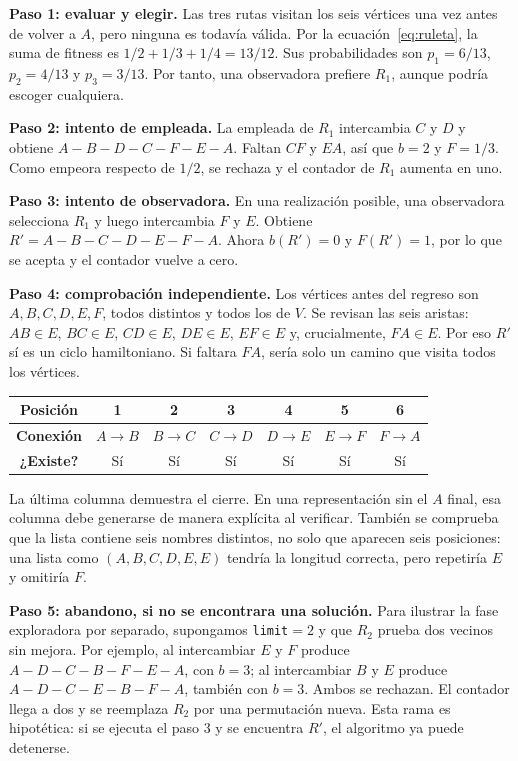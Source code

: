 \documentclass[11pt,letterpaper]{article}
\begin{document}
\noindent\textbf{Paso 1: evaluar y elegir.} Las tres rutas visitan los seis vértices una vez antes de volver a $A$, pero ninguna es todavía válida. Por la ecuación~\eqref{eq:ruleta}, la suma de fitness es $1/2+1/3+1/4=13/12$. Sus probabilidades son $p_1=6/13$, $p_2=4/13$ y $p_3=3/13$. Por tanto, una observadora prefiere $R_1$, aunque podría escoger cualquiera.

\noindent\textbf{Paso 2: intento de empleada.} La empleada de $R_1$ intercambia $C$ y $D$ y obtiene $A-B-D-C-F-E-A$. Faltan $CF$ y $EA$, así que $b=2$ y $F=1/3$. Como empeora respecto de $1/2$, se rechaza y el contador de $R_1$ aumenta en uno.

\noindent\textbf{Paso 3: intento de observadora.} En una realización posible, una observadora selecciona $R_1$ y luego intercambia $F$ y $E$. Obtiene $R'=A-B-C-D-E-F-A$. Ahora $b(R')=0$ y $F(R')=1$, por lo que se acepta y el contador vuelve a cero.

\noindent\textbf{Paso 4: comprobación independiente.} Los vértices antes del regreso son $A,B,C,D,E,F$, todos distintos y todos los de $V$. Se revisan las seis aristas: $AB\in E$, $BC\in E$, $CD\in E$, $DE\in E$, $EF\in E$ y, crucialmente, $FA\in E$. Por eso $R'$ sí es un ciclo hamiltoniano. Si faltara $FA$, sería solo un camino que visita todos los vértices.

\begin{center}
\small
\begin{tabular}{ccccccc}
\toprule
\textbf{Posición} & 1 & 2 & 3 & 4 & 5 & 6\\
\midrule
\textbf{Conexión} & $A\!\to\!B$ & $B\!\to\!C$ & $C\!\to\!D$ & $D\!\to\!E$ & $E\!\to\!F$ & $F\!\to\!A$\\
\textbf{¿Existe?} & Sí & Sí & Sí & Sí & Sí & Sí\\
\bottomrule
\end{tabular}
\end{center}

La última columna demuestra el cierre. En una representación sin el $A$ final, esa columna debe generarse de manera explícita al verificar. También se comprueba que la lista contiene seis nombres distintos, no solo que aparecen seis posiciones: una lista como $(A,B,C,D,E,E)$ tendría la longitud correcta, pero repetiría $E$ y omitiría $F$.

\noindent\textbf{Paso 5: abandono, si no se encontrara una solución.} Para ilustrar la fase exploradora por separado, supongamos \texttt{limit}$=2$ y que $R_2$ prueba dos vecinos sin mejora. Por ejemplo, al intercambiar $E$ y $F$ produce $A-D-C-B-F-E-A$, con $b=3$; al intercambiar $B$ y $E$ produce $A-D-C-E-B-F-A$, también con $b=3$. Ambos se rechazan. El contador llega a dos y se reemplaza $R_2$ por una permutación nueva. Esta rama es hipotética: si se ejecuta el paso 3 y se encuentra $R'$, el algoritmo ya puede detenerse.
\end{document}
